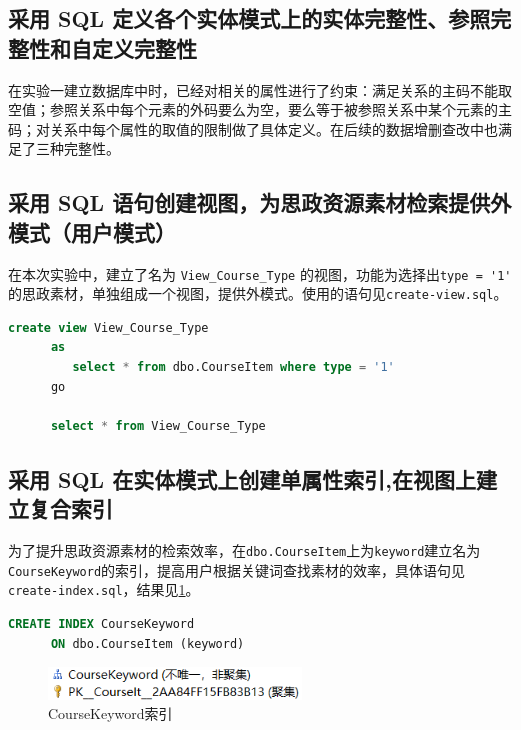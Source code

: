 \documentclass[11pt]{article}
\begin{document}
  \subsection{采用 SQL 定义各个实体模式上的实体完整性、参照完整性和自定义完整性}
  在实验一建立数据库中时，已经对相关的属性进行了约束：满足关系的主码不能取空值；参照关系中每个元素的外码要么为空，要么等于被参照关系中某个元素的主码；对关系中每个属性的取值的限制做了具体定义。在后续的数据增删查改中也满足了三种完整性。

  \subsection{采用 SQL 语句创建视图，为思政资源素材检索提供外模式（用户模式）}
  在本次实验中，建立了名为 \verb|View_Course_Type| 的视图，功能为选择出\verb|type = '1'| 的思政素材，单独组成一个视图，提供外模式。使用的语句见\verb|create-view.sql|。
  \begin{file}
    \begin{lstlisting}[language=sql]
      create view View_Course_Type
      as
         select * from dbo.CourseItem where type = '1'
      go
      
      select * from View_Course_Type
    \end{lstlisting}
  \end{file}

  \subsection{采用 SQL 在实体模式上创建单属性索引,在视图上建立复合索引}
  为了提升思政资源素材的检索效率，在\verb|dbo.CourseItem|上为\verb|keyword|建立名为\verb|CourseKeyword|的索引，提高用户根据关键词查找素材的效率，具体语句见\verb|create-index.sql|，结果见\ref{fig:index1}。
  \begin{file}
    \begin{lstlisting}[language=sql]
      CREATE INDEX CourseKeyword
      ON dbo.CourseItem (keyword)
    \end{lstlisting}
  \end{file}

  \begin{figure}[h]
    \centering
    \includegraphics[width=0.6\textwidth]{index1.png}
    \caption{CourseKeyword索引}
    \label{fig:index1}
  \end{figure}
\end{document}
